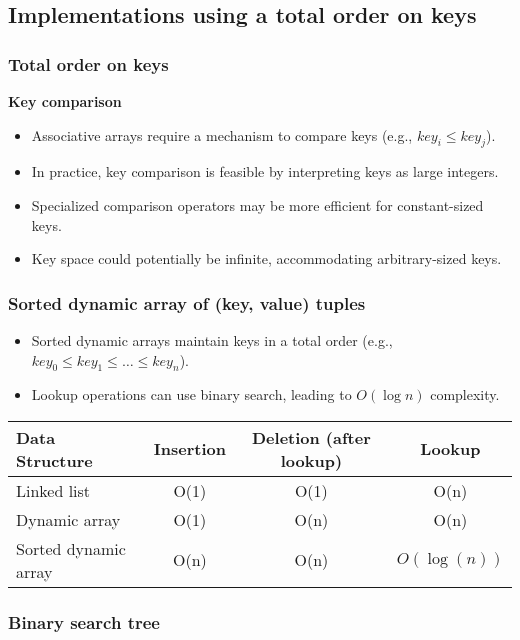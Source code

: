 \documentclass[12pt]{article}
\begin{document}
\subsection{Implementations using a total order on keys}
\subsubsection{Total order on keys}
\textbf{Key comparison}
\begin{itemize}
    \item Associative arrays require a mechanism to compare keys (e.g., \( key_i \leq key_j \)).
    \item In practice, key comparison is feasible by interpreting keys as large integers.
    \item Specialized comparison operators may be more efficient for constant-sized keys.
    \item Key space could potentially be infinite, accommodating arbitrary-sized keys.
\end{itemize}


\subsubsection{Sorted dynamic array of (key, value) tuples}

\begin{itemize}
    \item Sorted dynamic arrays maintain keys in a total order (e.g., \( key_0 \leq key_1 \leq \dots \leq key_n \)).
    \item Lookup operations can use binary search, leading to \( O(\log n) \) complexity.
\end{itemize}

\begin{tabular}{lccc}
\hline
\textbf{Data Structure} & \textbf{Insertion} & \textbf{Deletion (after lookup)} & \textbf{Lookup} \\
\hline
Linked list             & O(1)               & O(1)                            & O(n)             \\
Dynamic array           & O(1)               & O(n)                            & O(n)             \\
Sorted dynamic array    & O(n)               & O(n)                            & $O(\log(n))$       \\
\hline
\end{tabular}

\subsubsection{Binary search tree}
\end{document}
